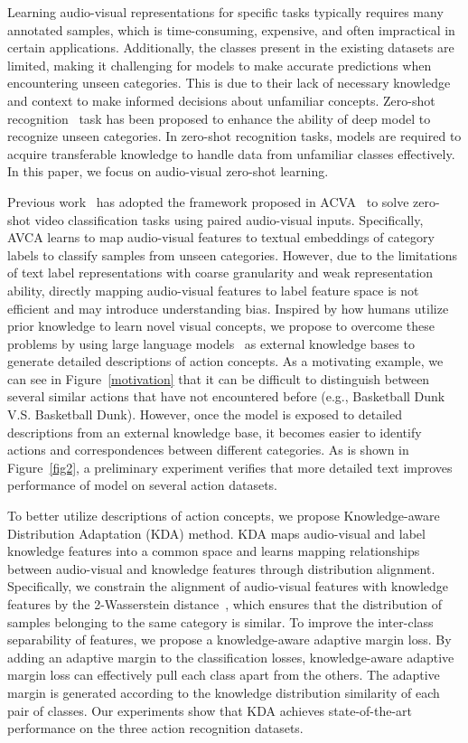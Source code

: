 \documentclass[10pt,twocolumn,letterpaper]{article}
\begin{document}
Learning audio-visual representations for specific tasks typically requires many annotated samples, which is time-consuming, expensive, and often impractical in certain applications. Additionally, the classes present in the existing datasets are limited, making it challenging for models to make accurate predictions when encountering unseen categories. This is due to their lack of necessary knowledge and context to make informed decisions about unfamiliar concepts. Zero-shot recognition~\cite{AVGZSLNet,AVCA,TCaF,HyperbolicAV} task has been proposed to enhance the ability of deep model to recognize unseen categories. In zero-shot recognition tasks, models are required to acquire transferable knowledge to handle data from unfamiliar classes effectively. In this paper, we focus on audio-visual zero-shot learning.

Previous work~\cite{TCaF,HyperbolicAV} has adopted the framework proposed in ACVA~\cite{AVCA} to solve zero-shot video classification tasks using paired audio-visual inputs. Specifically, AVCA learns to map audio-visual features to textual embeddings of category labels to classify samples from unseen categories. However, due to the limitations of text label representations with coarse granularity and weak representation ability, directly mapping audio-visual features to label feature space is not efficient and may introduce understanding bias.
Inspired by how humans utilize prior knowledge to learn novel visual concepts, we propose to overcome these problems by using large language models~\cite{brown2020language,touvron2023llama} as external knowledge bases to generate detailed descriptions of action concepts.
As a motivating example, we can see in Figure~\ref{motivation} that it can be difficult to distinguish between several similar actions that have not encountered before (e.g., Basketball Dunk V.S. Basketball Dunk).
However, once the model is exposed to detailed descriptions from an external knowledge base, it becomes easier to identify actions and correspondences between different categories.
As is shown in Figure~\ref{fig2}, a preliminary experiment verifies that more detailed text improves performance of model on several action datasets. 

To better utilize descriptions of action concepts, we propose Knowledge-aware Distribution Adaptation (KDA) method. 
KDA maps audio-visual and label knowledge features into a common space and learns mapping relationships between audio-visual and knowledge features through distribution alignment.
Specifically, we constrain the alignment of audio-visual features with knowledge features by the 2-Wasserstein distance~\cite{berthelot2017began,he2018wasserstein,chen2022multi}, which ensures that the distribution of samples belonging to the same category is similar.
To improve the inter-class separability of features, we propose a knowledge-aware adaptive margin loss.  
By adding an adaptive margin to the classification losses, knowledge-aware adaptive margin loss can effectively pull each class apart from the others. The adaptive margin is generated according to the knowledge distribution similarity of each pair of classes.
Our experiments show that KDA achieves state-of-the-art performance on the three action recognition datasets. 
\end{document}
